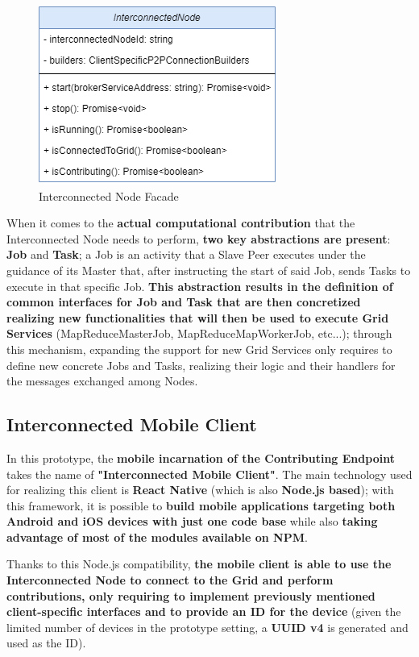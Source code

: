 \begin{figure}[!ht]
    \centering
    \includegraphics[scale=0.6]{document/chapters/chapter_7/images/interconnected_node_facade.png}
    \caption{Interconnected Node Facade}
    \label{fig:interconnected_node_facade}
\end{figure}

When it comes to the \textbf{actual computational contribution} that the Interconnected Node needs to perform, \textbf{two key abstractions are present}: \textbf{Job} and \textbf{Task}; a Job is an activity that a Slave Peer executes under the guidance of its Master that, after instructing the start of said Job, sends Tasks to execute in that specific Job. \textbf{This abstraction results in the definition of common interfaces for Job and Task that are then concretized realizing new functionalities that will then be used to execute Grid Services} (MapReduceMasterJob, MapReduceMapWorkerJob, etc...); through this mechanism, expanding the support for new Grid Services only requires to define new concrete Jobs and Tasks, realizing their logic and their handlers for the messages exchanged among Nodes.

\subsection{Interconnected Mobile Client}
In this prototype, the \textbf{mobile incarnation of the Contributing Endpoint} takes the name of \textbf{"Interconnected Mobile Client"}. The main technology used for realizing this client is \textbf{React Native} (which is also \textbf{Node.js based}); with this framework, it is possible to \textbf{build mobile applications targeting both Android and iOS devices with just one code base} while also \textbf{taking advantage of most of the modules available on NPM}.

Thanks to this Node.js compatibility, \textbf{the mobile client is able to use the Interconnected Node to connect to the Grid and perform contributions, only requiring to implement previously mentioned client-specific interfaces and to provide an ID for the device} (given the limited number of devices in the prototype setting, a \textbf{UUID v4} is generated and used as the ID).

